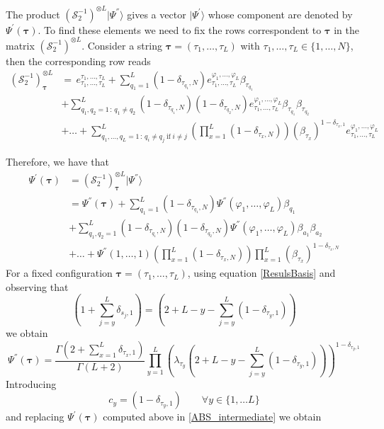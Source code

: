 \documentclass[10pt]{article}
\numberwithin{equation}{section}
\numberwithin{equation}{subsection}
\begin{document}
The product $\left(\mathcal{S}_{2}^{-1}\right)^{\otimes L}|\Psi^{''}\rangle$ gives a vector $|\Psi^{'}\rangle$ whose component are denoted by $\Psi^{'}(\bm{\tau})$. 
To find these elements we need to fix the rows correspondent to $\bm{\tau}$ in the matrix $\left(\mathcal{S}_{2}^{-1}\right)^{\otimes L}$. Consider a string $\bm{\tau}=(\tau_{1},\ldots,\tau_{L})$ with $\tau_{1},\ldots,\tau_{L}\in \{1,\ldots,N\}$, then the corresponding row reads
\begin{equation}
	\begin{split}
\left(\mathcal{S}_{2}^{-1}\right)^{\otimes L}_{\bm{\tau}}&=\,e_{\tau_{1},\ldots,\tau_{L}}^{\tau_{1},\ldots,\tau_{L}}+\sum_{q_{1}=1}^{L}(1-\delta_{\tau_{q_{1}},N})e_{\tau_{1},\ldots,\tau_{L}}^{\varphi_{1},\ldots,\varphi_{L}}\beta_{\tau_{q_{1}}}\\&+\sum_{q_{1},q_{2}=1\,:\,q_{1}\neq q_{2}}^{L}(1-\delta_{\tau_{q_{1}},N})(1-\delta_{\tau_{q_{2}},N})e_{\tau_{1},\ldots,\tau_{L}}^{\varphi_{1},\ldots,\varphi_{L}}\beta_{\tau_{q_{1}}}\beta_{\tau_{q_{2}}}
  \\&+
  \ldots+\sum_{q_{1},\ldots,q_{L}=1\,:\,q_{i}\neq q_{j}\;\text{if}\;i\neq j}^{L}\left(\prod_{x=1}^{L}(1-\delta_{\tau_{x},N})\right)\left(\beta_{\tau_{x}}\right)^{1-\delta_{\tau_{x},1}}e_{\tau_{1},\ldots,\tau_{L}}^{\varphi_{1},\ldots,\varphi_{L}}
	\end{split}
\end{equation}

Therefore, we have that 
\begin{equation}\label{ABS_intermediate}
	\begin{split}
		\Psi^{'}(\bm{\tau})&=(\mathcal{S}_{2}^{-1})_{\bm{\tau}}^{\otimes L}|\Psi^{''}\rangle\\&= \Psi^{''}(\bm{\tau})+\sum_{q_{1}= 1}^{L}(1-\delta_{\tau_{q_{1}},N})\Psi^{''}(\varphi_{1},\ldots,\varphi_{L})\beta_{q_{1}}\\&+
		\sum_{q_{1},q_{2}= 1}^{L}(1-\delta_{\tau_{q_{1}},N})(1-\delta_{\tau_{q_{2}},N})\Psi^{''}(\varphi_{1},\ldots,\varphi_{L})\beta_{a_{1}}\beta_{a_{2}}\\&+\ldots+\Psi^{''}(1,\ldots,1)\left(\prod_{x=1}^{L}(1-\delta_{\tau_{x},N})\right)\prod_{x=1}^{L}\left(\beta_{\tau_{x}}\right)^{1-\delta_{\tau_{x},N}}
	\end{split}
\end{equation}
For a fixed configuration $\bm{\tau}=(\tau_{1},\ldots,\tau_{L})$, using equation \eqref{ResulsBasis} and observing that 
\begin{equation}
  \left(1+\sum_{j=y}^{L}\delta_{s_{j},1}\right) =\left(2+L-y-\sum_{j=y}^{L}(1-\delta_{\tau_{y},1})\right)
\end{equation}
we obtain 
    \begin{equation}
\Psi^{''}(\bm{\tau})=\frac{\Gamma(2+\sum_{x=1}^{L}\delta_{\tau_{x},1})}{\Gamma(L+2)}\prod_{y=1}^{L}\left(\lambda_{\tau_{y}}\left(2+L-y-\sum_{j=y}^{L}(1-\delta_{\tau_{y},1})\right)\right)^{1-\delta_{\tau_{y},1}}
\end{equation}
Introducing
\begin{equation}
	c_{y}=(1-\delta_{\tau_{y},1}) \qquad \forall y\in \{1,\ldots L\}
\end{equation}
and replacing $\Psi^{'}(\bm{\tau})$ computed above in \eqref{ABS_intermediate} we obtain 
\end{document}
